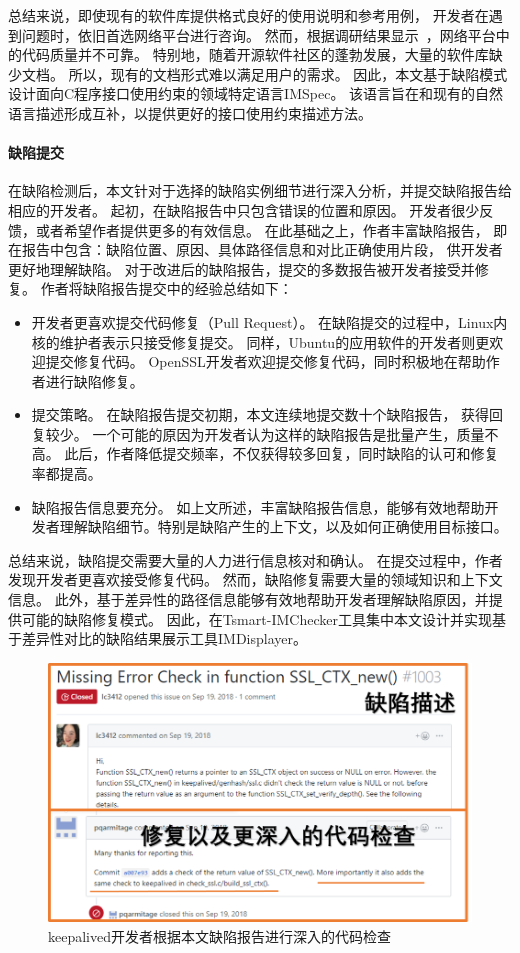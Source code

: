 总结来说，即使现有的软件库提供格式良好的使用说明和参考用例，
开发者在遇到问题时，依旧首选网络平台进行咨询。
然而，根据调研结果显示~\cite{18-icse-stack}，网络平台中的代码质量并不可靠。
特别地，随着开源软件社区的蓬勃发展，大量的软件库缺少文档。
所以，现有的文档形式难以满足用户的需求。
因此，本文基于缺陷模式设计面向C程序接口使用约束的领域特定语言IMSpec。
该语言旨在和现有的自然语言描述形成互补，以提供更好的接口使用约束描述方法。



\paragraph{缺陷提交}
在缺陷检测后，本文针对于选择的缺陷实例细节进行深入分析，并提交缺陷报告给相应的开发者。
起初，在缺陷报告中只包含错误的位置和原因。
开发者很少反馈，或者希望作者提供更多的有效信息。
在此基础之上，作者丰富缺陷报告，
即在报告中包含：缺陷位置、原因、具体路径信息和对比正确使用片段，
供开发者更好地理解缺陷。
对于改进后的缺陷报告，提交的多数报告被开发者接受并修复。
作者将缺陷报告提交中的经验总结如下：
\begin{itemize}
	\item 开发者更喜欢提交代码修复（Pull Request）。
	在缺陷提交的过程中，Linux内核的维护者表示只接受修复提交。
	同样，Ubuntu的应用软件的开发者则更欢迎提交修复代码。
	OpenSSL开发者欢迎提交修复代码，同时积极地在帮助作者进行缺陷修复。
	\item 提交策略。
	在缺陷报告提交初期，本文连续地提交数十个缺陷报告，
	获得回复较少。
	一个可能的原因为开发者认为这样的缺陷报告是批量产生，质量不高。
	此后，作者降低提交频率，不仅获得较多回复，同时缺陷的认可和修复率都提高。
	\item 缺陷报告信息要充分。
	如上文所述，丰富缺陷报告信息，能够有效地帮助开发者理解缺陷细节。特别是缺陷产生的上下文，以及如何正确使用目标接口。
\end{itemize}

总结来说，缺陷提交需要大量的人力进行信息核对和确认。
在提交过程中，作者发现开发者更喜欢接受修复代码。
然而，缺陷修复需要大量的领域知识和上下文信息。
此外，基于差异性的路径信息能够有效地帮助开发者理解缺陷原因，并提供可能的缺陷修复模式。
因此，在Tsmart-IMChecker工具集中本文设计并实现基于差异性对比的缺陷结果展示工具IMDisplayer。

\begin{figure}[b]
	\centering
	\includegraphics[width=0.8\linewidth]{figures/cp4-keepalived-fix.png}
	\caption{
		keepalived开发者根据本文缺陷报告进行深入的代码检查
	}
	\label{fig:4-4-keepalived-fix}
\end{figure}

